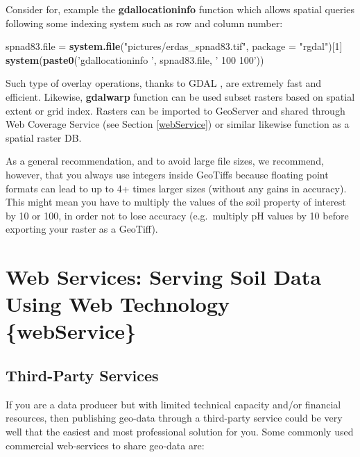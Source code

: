 \documentclass[10pt,b5paper,]{book}
\newenvironment{Shaded}{\begin{snugshade}}{\end{snugshade}}
\newcommand{\DataTypeTok}[1]{\textcolor[rgb]{0.13,0.29,0.53}{#1}}
\newcommand{\DecValTok}[1]{\textcolor[rgb]{0.00,0.00,0.81}{#1}}
\newcommand{\KeywordTok}[1]{\textcolor[rgb]{0.13,0.29,0.53}{\textbf{#1}}}
\newcommand{\NormalTok}[1]{#1}
\newcommand{\StringTok}[1]{\textcolor[rgb]{0.31,0.60,0.02}{#1}}
\theoremstyle{definition}
\theoremstyle{definition}
\theoremstyle{definition}
\theoremstyle{remark}
\begin{document}
Consider for, example the \textbf{gdallocationinfo} function which
allows spatial queries following some indexing system such as row and
column number:

\begin{Shaded}
\begin{Highlighting}[]
\NormalTok{spnad83.file =}\StringTok{ }\KeywordTok{system.file}\NormalTok{(}\StringTok{"pictures/erdas_spnad83.tif"}\NormalTok{, }
                           \DataTypeTok{package =} \StringTok{"rgdal"}\NormalTok{)[}\DecValTok{1}\NormalTok{]}
\KeywordTok{system}\NormalTok{(}\KeywordTok{paste0}\NormalTok{(}\StringTok{'gdallocationinfo '}\NormalTok{, spnad83.file, }\StringTok{' 100 100'}\NormalTok{))}
\end{Highlighting}
\end{Shaded}

Such type of overlay operations, thanks to GDAL
\citep{warmerdam_geospatial_2008}, are extremely fast and efficient.
Likewise, \textbf{gdalwarp} function can be used subset rasters based on
spatial extent or grid index. Rasters can be imported to GeoServer and
shared through Web Coverage Service (see Section \ref{webService}) or
similar likewise function as a spatial raster DB.

As a general recommendation, and to avoid large file sizes, we
recommend, however, that you always use integers inside GeoTiffs because
floating point formats can lead to up to 4+ times larger sizes (without
any gains in accuracy). This might mean you have to multiply the values
of the soil property of interest by 10 or 100, in order not to lose
accuracy (e.g.~multiply pH values by 10 before exporting your raster as
a GeoTiff).

\hypertarget{web-services-serving-soil-data-using-web-technology-webservice}{%
\section{Web Services: Serving Soil Data Using Web Technology
\{webService\}}\label{web-services-serving-soil-data-using-web-technology-webservice}}

\hypertarget{third-party-services}{%
\subsection{Third-Party Services}\label{third-party-services}}

If you are a data producer but with limited technical capacity and/or
financial resources, then publishing geo-data through a third-party
service could be very well that the easiest and most professional
solution for you. Some commonly used commercial web-services to share
geo-data are:
\end{document}
